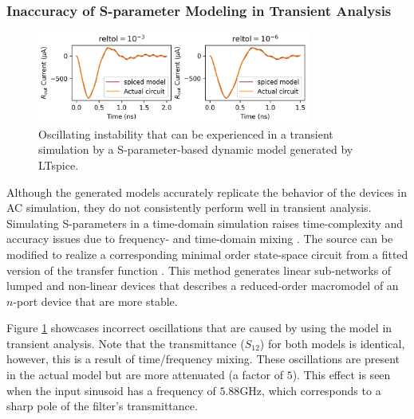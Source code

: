 \subsubsection{Inaccuracy of S-parameter Modeling in Transient Analysis}

\begin{figure}
    \centering
    \includegraphics[width=0.8\textwidth]{figs/td_LC_sad.png}
    \caption{Oscillating instability that can be experienced in a transient simulation
    by a S-parameter-based dynamic model generated by LTspice.}
    \label{fig:td_sparam_sad}
\end{figure}

Although the generated models accurately replicate the behavior of the devices in 
AC simulation, they do not consistently perform well in transient analysis.
Simulating S-parameters in a time-domain simulation raises 
time-complexity and accuracy issues due to frequency- and time-domain 
mixing \cite{td-fd-mixing}.
The  source can be modified to realize a corresponding 
minimal order state-space circuit from a fitted version of the transfer 
function \cite{arb-sparam-spice}.
This method generates linear sub-networks of lumped and non-linear devices
that describes a reduced-order macromodel of an $n$-port device that
are more stable.

Figure \ref{fig:td_sparam_sad} showcases incorrect oscillations that are caused by
using the  model in transient analysis. Note that the transmittance ($S_{12}$)
for both models is identical, however, this is a result of time/frequency mixing.
These oscillations are present in the actual model but are more attenuated (a factor
of $5$). This effect is seen when the input sinusoid has a frequency of $5.88$GHz,
which corresponds to a sharp pole of the filter's transmittance.



